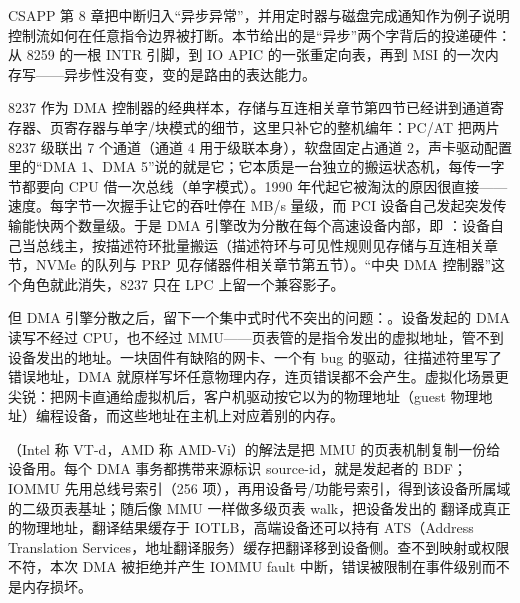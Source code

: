 \begin{classicnote}
CSAPP 第 8 章把中断归入“异步异常”，并用定时器与磁盘完成通知作为例子说明控制流如何在任意指令边界被打断。本节给出的是“异步”两个字背后的投递硬件：从 8259 的一根 INTR 引脚，到 IO APIC 的一张重定向表，再到 MSI 的一次内存写——异步性没有变，变的是路由的表达能力。
\end{classicnote}


8237 作为 DMA 控制器的经典样本，存储与互连相关章节第四节已经讲到通道寄存器、页寄存器与单字/块模式的细节，这里只补它的整机编年：PC/AT 把两片 8237 级联出 7 个通道（通道 4 用于级联本身），软盘固定占通道 2，声卡驱动配置里的“DMA 1、DMA 5”说的就是它；它本质是一台独立的搬运状态机，每传一字节都要向 CPU 借一次总线（单字模式）。1990 年代起它被淘汰的原因很直接——速度。每字节一次握手让它的吞吐停在 MB/s 量级，而 PCI 设备自己发起突发传输能快两个数量级。于是 DMA 引擎改为分散在每个高速设备内部，即 ：设备自己当总线主，按描述符环批量搬运（描述符环与可见性规则见存储与互连相关章节，NVMe 的队列与 PRP 见存储器件相关章节第五节）。“中央 DMA 控制器”这个角色就此消失，8237 只在 LPC 上留一个兼容影子。

但 DMA 引擎分散之后，留下一个集中式时代不突出的问题：。设备发起的 DMA 读写不经过 CPU，也不经过 MMU——页表管的是指令发出的虚拟地址，管不到设备发出的地址。一块固件有缺陷的网卡、一个有 bug 的驱动，往描述符里写了错误地址，DMA 就原样写坏任意物理内存，连页错误都不会产生。虚拟化场景更尖锐：把网卡直通给虚拟机后，客户机驱动按它以为的物理地址（guest 物理地址）编程设备，而这些地址在主机上对应着别的内存。

（Intel 称 VT-d，AMD 称 AMD-Vi）的解法是把 MMU 的页表机制复制一份给设备用。每个 DMA 事务都携带来源标识 source-id，就是发起者的 BDF；IOMMU 先用总线号索引（256 项），再用设备号/功能号索引，得到该设备所属域的二级页表基址；随后像 MMU 一样做多级页表 walk，把设备发出的  翻译成真正的物理地址，翻译结果缓存于 IOTLB，高端设备还可以持有 ATS（Address Translation Services，地址翻译服务）缓存把翻译移到设备侧。查不到映射或权限不符，本次 DMA 被拒绝并产生 IOMMU fault 中断，错误被限制在事件级别而不是内存损坏。

